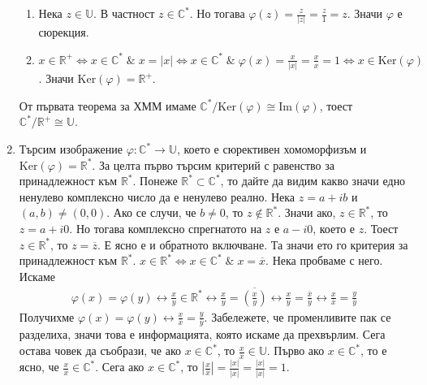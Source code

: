 \documentclass[12pt]{article}
\begin{document}
\begin{enumerate}[label=\alph*)]
\begin{enumerate}[label=\arabic*.]
        \item Нека \(z \in \mathbb{U}\). В частност \(z \in \mathbb{C}^*\).
        Но тогава \(\varphi(z) = \displaystyle\frac{z}{|z|} = \displaystyle\frac{z}{1} = z\). Значи \(\varphi\) е сюрекция.
        \item \(x \in \mathbb{R}^+ \iff x \in \mathbb{C}^* \; \& \; x = |x| \iff
        x \in \mathbb{C}^* \; \& \; \varphi(x) = \displaystyle\frac{x}{|x|} = \displaystyle\frac{x}{x} = 1 \iff x \in \mathrm{Ker}(\varphi)\).
        Значи \(\mathrm{Ker}(\varphi) = \mathbb{R}^+\).
    \end{enumerate}
    От първата теорема за ХММ имаме \(\mathbb{C}^* / \mathrm{Ker}(\varphi) \cong \mathrm{Im}(\varphi)\), тоест \(\mathbb{C}^* / \mathbb{R}^+ \cong \mathbb{U}\).
    \item Търсим изображение \(\varphi : \mathbb{C}^* \to \mathbb{U}\),
    което е сюрективен хомоморфизъм и \(\mathrm{Ker}(\varphi) = \mathbb{R}^*\).
    За целта първо търсим критерий с равенство за принадлежност към \(\mathbb{R}^*\).
    Понеже \(\mathbb{R}^* \subset \mathbb{C}^*\), то дайте да видим какво значи едно ненулево комплексно число да е ненулево реално. Нека \(z = a + ib\) и \((a, b) \neq (0, 0)\). Ако се случи, че \(b \neq 0\), то \(z \notin \mathbb{R}^*\).
    Значи ако, \(z \in \mathbb{R}^*\), то \(z = a + i0\). Но тогава комплексно спрегнатото на \(z\) е \(a - i0\), което е \(z\). Тоест \(z \in \mathbb{R}^*\), то \(z = \overline{z}\). Е ясно е и обратното включване. Та значи ето го критерия за принадлежност към \(\mathbb{R}^*\). \(x \in \mathbb{R}^* \iff x \in \mathbb{C}^* \; \& \; x = \overline{x}\).
    Нека пробваме с него.
    Искаме \begin{align*}
        \varphi(x) = \varphi(y) \longleftrightarrow 
        \displaystyle\frac{x}{y} \in \mathbb{R}^* \longleftrightarrow 
        \displaystyle\frac{x}{y} = \overline{\left(\displaystyle\frac{x}{y}\right)} \longleftrightarrow
        \displaystyle\frac{x}{y} = \displaystyle\frac{\overline{x}}{\overline{y}} \longleftrightarrow
        \displaystyle\frac{x}{\overline{x}} = \displaystyle\frac{y}{\overline{y}}
    \end{align*}
    Получихме \(\varphi(x) = \varphi(y) \longleftrightarrow
        \displaystyle\frac{x}{\overline{x}} = \displaystyle\frac{y}{\overline{y}}\).
    Забележете, че променливите пак се разделиха, значи това е информацията, която искаме да прехвърлим. Сега остава човек да съобрази, че ако \(x \in \mathbb{C}^*\), то
    \(\displaystyle\frac{x}{\overline{x}} \in \mathbb{U}\). Първо ако \(x \in \mathbb{C}^*\), то е ясно, че \(\displaystyle\frac{x}{\overline{x}} \in \mathbb{C}^*\). Сега ако \(x \in \mathbb{C}^*\), то \(\left|\displaystyle\frac{x}{\overline{x}}\right| = \displaystyle\frac{|x|}{|\overline{x}|} = \displaystyle\frac{|x|}{|x|} = 1\).

\end{enumerate}
\end{document}
